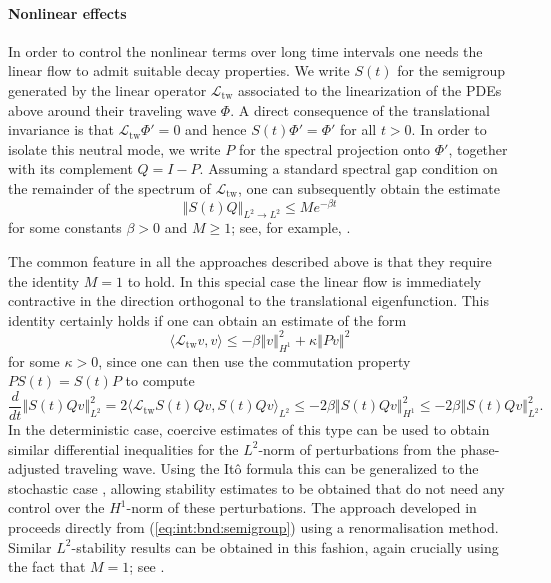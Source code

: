 \documentclass[10pt]{articleHJ}
\newcommand{\norm}[1]{\left\Vert#1\right\Vert}		%
\newcommand{\sref}[1]{(\ref{#1})}                       %
\numberwithin{equation}{section}
\begin{document}
\paragraph{Nonlinear effects}
In order to control the nonlinear terms over long time intervals
one needs the linear flow to admit suitable decay properties.
We write $S(t)$ for the semigroup generated by the
linear operator $\mathcal{L}_{\mathrm{tw}}$ associated to the linearization
of the PDEs above around their traveling wave $\Phi$.
A direct consequence of the translational invariance is that
$\mathcal{L}_{\mathrm{tw}} \Phi' = 0$ and hence $S(t) \Phi' = \Phi'$ for all $t > 0$.
In order to isolate this neutral mode, we write $P$ for the spectral projection onto $\Phi'$,
together with its complement $Q = I-P$.
Assuming a standard spectral gap condition on the remainder of the spectrum of $\mathcal{L}_{\mathrm{tw}}$,
one can subsequently obtain the estimate
\begin{equation}
\label{eq:int:bnd:semigroup}
\norm{S(t) Q}_{L^2 \to L^2} \le M e^{ - \beta t}
\end{equation}
for some constants $\beta > 0$ and $M \ge 1$;
see, for example, \cite[Lem. 5.1.2]{volpert1994traveling}.

The common feature in all the approaches described above
is that they require the identity $M = 1$ to hold. In this special
case the linear flow is immediately contractive in the direction orthogonal to the
translational eigenfunction.
This identity certainly holds if one can obtain an estimate of the form
\begin{equation}
\label{eq:int:coercivity:eq}
\langle \mathcal{L}_{\mathrm{tw}} v , v \rangle \le -  \beta \norm{v}_{H^1}^2  + \kappa \norm{P v}^2
\end{equation}
for some $\kappa > 0$, since one can then use the commutation property
$P S(t)  =  S(t) P$ to compute
\begin{equation}
\frac{d}{dt} \norm{S(t) Q v}_{L^2}^2 = 2 \langle \mathcal{L}_{\mathrm{tw}} S(t) Qv, S(t) Q v \rangle_{L^2}
\le - 2 \beta \norm{S(t) Q v}_{H^1}^2
\le - 2 \beta \norm{S(t) Q v}_{L^2}^2 .
\end{equation}
In the deterministic case,  coercive estimates of this type
can be used to obtain similar differential inequalities
for the $L^2$-norm of perturbations from the phase-adjusted traveling wave.
Using the It{\^o} formula this can be generalized to the stochastic
case \cite{Stannat,stannat2014stability,Lang,LangStannat2016l2},
allowing stability estimates to be obtained that do not need
any control over the $H^1$-norm of these perturbations.
The approach developed in \cite{Inglis} proceeds directly
from \sref{eq:int:bnd:semigroup} using a renormalisation method.
Similar $L^2$-stability results can be obtained in this fashion,
again crucially using the fact that $M = 1$; see \cite[(6.15)]{Inglis}.
\end{document}
